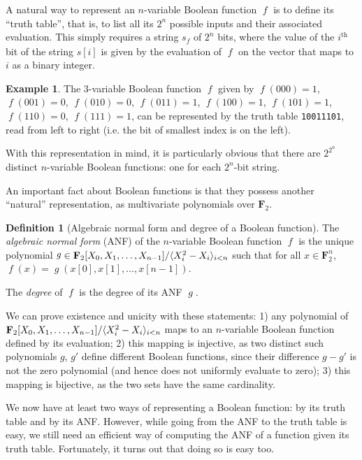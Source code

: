 \documentclass[11pt,a4paper]{article}
\theoremstyle{definition}
\newtheorem{defi}{Definition}
\newtheorem{example}{Example}
\theoremstyle{theorem}
\DeclareMathOperator\bF{\mathit{f}}
\DeclareMathOperator\abF{\mathit{g}}
\begin{document}
A natural way to represent an $n$-variable Boolean function $\bF$ is to define its ``truth table'', that is, to list all its $2^n$ possible
inputs and their associated evaluation. This simply requires a string $s_{\bF}$ of $2^n$ bits, where the value of the $i^\text{th}$ bit
of the string $s[i]$ is given by the evaluation of $\bF$ on the vector that maps to $i$ as a binary integer.
\begin{example}
\label{example1}
The 3-variable Boolean function $\bF$ given by
$\bF(000) = 1$,
$\bF(001) = 0$,
$\bF(010) = 0$,
$\bF(011) = 1$,
$\bF(100) = 1$,
$\bF(101) = 1$,
$\bF(110) = 0$,
$\bF(111) = 1$, can be represented by the truth table \texttt{10011101}, read from left to right (i.e. the bit of smallest index is on the left).
\end{example}
With this representation in mind, it is particularly obvious that there are $2^{2^n}$ distinct $n$-variable Boolean functions: one for each $2^n$-bit
string.

An important fact about Boolean functions is that they possess another ``natural'' representation, as multivariate polynomials over $\mathbf{F}_2$.
\begin{defi}[Algebraic normal form and degree of a Boolean function]
The \emph{algebraic normal form} (ANF) of the $n$-variable Boolean function $\bF$ is the unique polynomial
$\abF \in \mathbf{F}_2[X_0,X_1,\ldots,\linebreak X_{n-1}]/\langle X_i^2 - X_i \rangle_{i < n}$ such that for all $x \in \mathbf{F}_2^n$,
$\bF(x) = \abF(x[0], x[1],\ldots,x[n-1])$.

The \emph{degree} of $\bF$ is the degree of its ANF $\abF$.
\end{defi}


We can prove existence and unicity with these statements: 1) any polynomial of $\mathbf{F}_2[X_0,X_1,\linebreak\ldots,X_{n-1}]/\langle X_i^2 - X_i \rangle_{i < n}$
maps to an $n$-variable Boolean function defined by its evaluation; 2) this mapping is injective, as 
two distinct such polynomials $g$, $g'$ define different Boolean functions,
since their difference $g - g'$ is not the zero polynomial (and hence does not uniformly evaluate to zero); 3) this mapping is bijective, as
the two sets have the same cardinality.

\medskip

We now have at least two ways of representing a Boolean function: by its truth table and by its ANF. However, while going from the ANF to the truth
table is easy, we still need an efficient way of computing the ANF of a function given its truth table. Fortunately, it turns out that doing
so is easy too.
\end{document}
